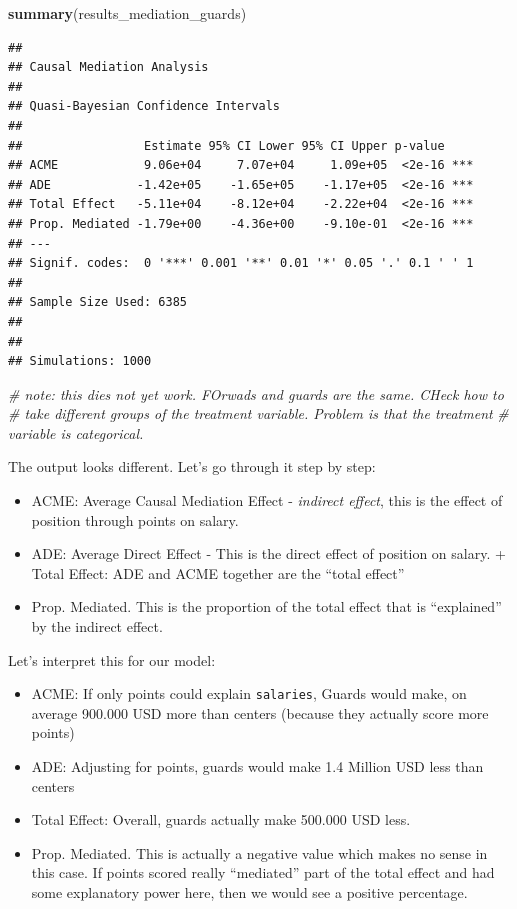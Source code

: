 \documentclass[
]{book}
\newenvironment{Shaded}{\begin{snugshade}}{\end{snugshade}}
\newcommand{\CommentTok}[1]{\textcolor[rgb]{0.56,0.35,0.01}{\textit{#1}}}
\newcommand{\FunctionTok}[1]{\textcolor[rgb]{0.13,0.29,0.53}{\textbf{#1}}}
\newcommand{\NormalTok}[1]{#1}
\providecommand{\tightlist}{%
  \setlength{\itemsep}{0pt}\setlength{\parskip}{0pt}}
\begin{document}
\begin{Shaded}
\begin{Highlighting}[]
\FunctionTok{summary}\NormalTok{(results\_mediation\_guards)}
\end{Highlighting}
\end{Shaded}

\begin{verbatim}
## 
## Causal Mediation Analysis 
## 
## Quasi-Bayesian Confidence Intervals
## 
##                 Estimate 95% CI Lower 95% CI Upper p-value    
## ACME            9.06e+04     7.07e+04     1.09e+05  <2e-16 ***
## ADE            -1.42e+05    -1.65e+05    -1.17e+05  <2e-16 ***
## Total Effect   -5.11e+04    -8.12e+04    -2.22e+04  <2e-16 ***
## Prop. Mediated -1.79e+00    -4.36e+00    -9.10e-01  <2e-16 ***
## ---
## Signif. codes:  0 '***' 0.001 '**' 0.01 '*' 0.05 '.' 0.1 ' ' 1
## 
## Sample Size Used: 6385 
## 
## 
## Simulations: 1000
\end{verbatim}

\begin{Shaded}
\begin{Highlighting}[]
\CommentTok{\# note: this dies not yet work. FOrwads and guards are the same. CHeck how to }
\CommentTok{\# take different groups of the treatment variable. Problem is that the treatment}
\CommentTok{\# variable is categorical.}
\end{Highlighting}
\end{Shaded}

The output looks different. Let's go through it step by step:

\begin{itemize}
\tightlist
\item
  ACME: Average Causal Mediation Effect - \emph{indirect effect}, this is the effect of position through points on salary.\\
\item
  ADE: Average Direct Effect - This is the direct effect of position on salary. + Total Effect: ADE and ACME together are the ``total effect''\\
\item
  Prop. Mediated. This is the proportion of the total effect that is ``explained'' by the indirect effect.
\end{itemize}

Let's interpret this for our model:

\begin{itemize}
\tightlist
\item
  ACME: If only points could explain \texttt{salaries}, Guards would make, on average 900.000 USD more than centers (because they actually score more points)
\item
  ADE: Adjusting for points, guards would make 1.4 Million USD less than centers
\item
  Total Effect: Overall, guards actually make 500.000 USD less.
\item
  Prop. Mediated. This is actually a negative value which makes no sense in this case. If points scored really ``mediated'' part of the total effect and had some explanatory power here, then we would see a positive percentage.
\end{itemize}
\end{document}

